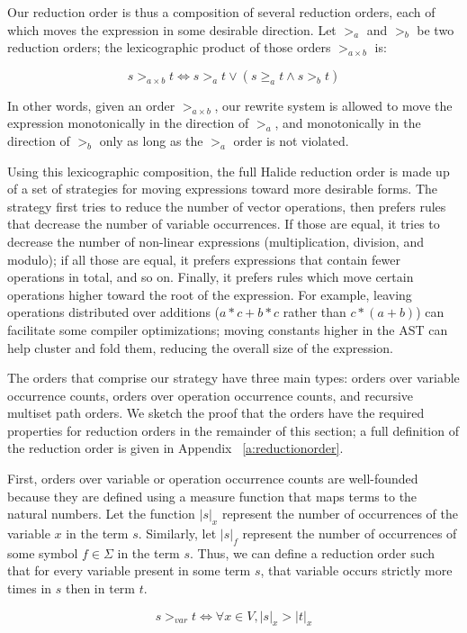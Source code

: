 \documentclass[sigplan,10pt,review,anonymous]{acmart}\settopmatter{printfolios=true,printccs=false,printacmref=false}
\begin{document}
Our reduction order is thus a composition of several reduction orders, each of
which moves the expression in some desirable direction. Let $>_a$ and $>_b$ be
two reduction orders; the lexicographic product of those orders $>_{a \times b}$
is:

\[
s >_{a \times b} t \iff s >_a t \vee (s \geq_a t \wedge s >_b t)
\] 

In other words, given an order $>_{a \times b}$, our rewrite system is allowed
to move the expression monotonically in the direction of $>_a$, and
monotonically in the direction of $>_b$ only as long as the $>_a$ order is not
violated.

Using this lexicographic composition, the full Halide reduction order is made up of a set of strategies for moving expressions toward more desirable forms. The strategy first tries to reduce the number of vector operations, then prefers rules that decrease the number of variable occurrences. If those are equal, it tries to decrease the number of non-linear expressions (multiplication, division, and modulo); if all those are equal, it prefers expressions that contain fewer operations in total, and so on. Finally, it prefers rules which move certain operations higher toward the root of the expression. For example,
leaving operations distributed over additions ($a*c + b*c$ rather than
$c*(a +b)$) can facilitate some compiler optimizations; moving constants higher in the
AST can help cluster and fold them, reducing the overall size of the expression.

The orders that comprise our strategy have three main types: orders over variable
occurrence counts, orders over operation occurrence counts, and recursive
multiset path orders. We sketch the proof that the orders have the required
properties for reduction orders in the remainder of this section; a full
definition of the reduction order is given in Appendix ~\ref{a:reductionorder}.

First, orders over variable or operation occurrence counts are well-founded 
because they are defined using a measure function that maps terms to the natural
numbers. Let the function $|s|_x$ represent the number of occurrences of the
variable $x$ in the term $s$. Similarly, let $|s|_f$ represent the number of
occurrences of some symbol $f \in \Sigma$ in the term $s$. Thus, we can define a reduction order such that for every variable present in some term $s$, that variable occurs strictly more times in $s$ then in term $t$.

\begin{equation*}
s >_{var} t \iff \forall x \in V, |s|_x > |t|_x
\end{equation*}
\end{document}
